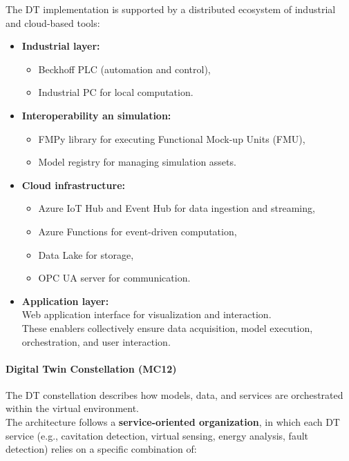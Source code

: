 \documentclass[
]{article}
\providecommand{\tightlist}{%
  \setlength{\itemsep}{0pt}\setlength{\parskip}{0pt}}
\begin{document}
The DT implementation is supported by a distributed ecosystem of
industrial and cloud-based tools:

\begin{itemize}
\tightlist
\item
  \textbf{Industrial layer:}

  \begin{itemize}
  \tightlist
  \item
    Beckhoff PLC (automation and control),
  \item
    Industrial PC for local computation.
  \end{itemize}
\item
  \textbf{Interoperability an simulation:}

  \begin{itemize}
  \tightlist
  \item
    FMPy library for executing Functional Mock-up Units (FMU),
  \item
    Model registry for managing simulation assets.
  \end{itemize}
\item
  \textbf{Cloud infrastructure:}

  \begin{itemize}
  \tightlist
  \item
    Azure IoT Hub and Event Hub for data ingestion and streaming,
  \item
    Azure Functions for event-driven computation,
  \item
    Data Lake for storage,
  \item
    OPC UA server for communication.
  \end{itemize}
\item
  \textbf{Application layer:}\\
  Web application interface for visualization and interaction.\\
  These enablers collectively ensure data acquisition, model execution,
  orchestration, and user interaction.
\end{itemize}

\paragraph{Digital Twin Constellation
(MC12)}\label{digital-twin-constellation-mc12}

The DT constellation describes how models, data, and services are
orchestrated within the virtual environment.\\
The architecture follows a \textbf{service-oriented organization}, in
which each DT service (e.g., cavitation detection, virtual sensing,
energy analysis, fault detection) relies on a specific combination of:
\end{document}
